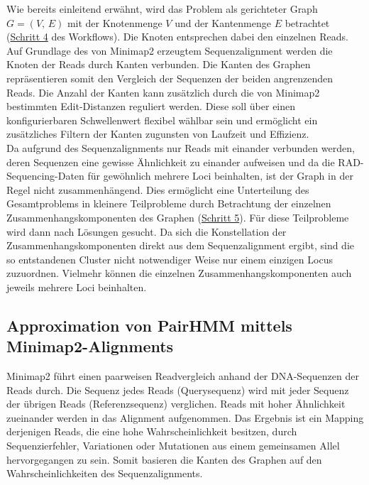 Wie bereits einleitend erwähnt, wird das Problem als gerichteter Graph $G=(V, \, E)$ mit der Knotenmenge $V$ und der Kantenmenge $E$ betrachtet (\hyperref[step4]{Schritt 4\label{step4txt}} des Workflows). Die Knoten entsprechen dabei den einzelnen Reads. Auf Grundlage des von Minimap2 erzeugtem Sequenzalignment werden die Knoten der Reads durch Kanten verbunden. Die Kanten des Graphen repräsentieren somit den Vergleich der Sequenzen der beiden angrenzenden Reads. Die Anzahl der Kanten kann zusätzlich durch die von Minimap2 bestimmten Edit-Distanzen reguliert werden. Diese soll über einen konfigurierbaren Schwellenwert flexibel wählbar sein und ermöglicht ein zusätzliches Filtern der Kanten zugunsten von  Laufzeit und Effizienz. \\

Da aufgrund des Sequenzalignments nur Reads mit einander verbunden werden, deren Sequenzen eine gewisse Ähnlichkeit zu einander aufweisen und da die RAD-Sequencing-Daten für gewöhnlich mehrere Loci beinhalten, ist der Graph in der Regel nicht zusammenhängend. Dies ermöglicht eine Unterteilung des Gesamtproblems in kleinere Teilprobleme durch Betrachtung der einzelnen Zusammenhangskomponenten des Graphen (\hyperref[step5]{Schritt 5\label{step5txt}}). Für diese Teilprobleme wird dann nach Lösungen gesucht. Da sich die Konstellation der Zusammenhangskomponenten direkt aus dem Sequenzalignment ergibt, sind die so entstandenen Cluster nicht notwendiger Weise nur einem einzigen Locus zuzuordnen. Vielmehr können die einzelnen Zusammenhangskomponenten auch jeweils mehrere Loci beinhalten. \\

\subsection{Approximation von PairHMM mittels Minimap2-Alignments} \label{subsec:phmm_minimap}

Minimap2 führt einen paarweisen Readvergleich anhand der DNA-Sequenzen der Reads durch. Die Sequenz jedes Reads (Querysequenz) wird mit jeder Sequenz der übrigen Reads (Referenzsequenz) verglichen. Reads mit hoher Ähnlichkeit zueinander werden in das Alignment aufgenommen. Das Ergebnis ist ein Mapping derjenigen Reads, die eine hohe Wahrscheinlichkeit besitzen, durch Sequenzierfehler, Variationen oder Mutationen aus einem gemeinsamen Allel hervorgegangen zu sein. Somit basieren die Kanten des Graphen auf den Wahrscheinlichkeiten des Sequenzalignments. \\

